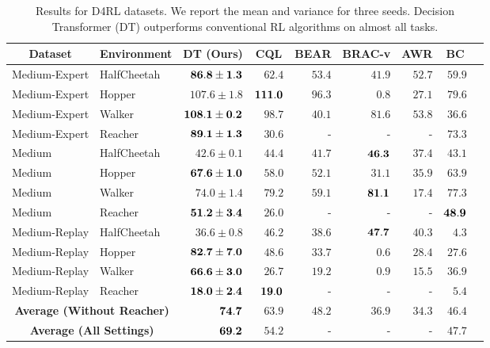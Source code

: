 \addtocounter{footnote}{-1}
\begin{table}[h]
\centering
\small
\begin{tabular}{llrrrrrrr}
\toprule
\multicolumn{1}{c}{\bf Dataset} & \multicolumn{1}{c}{\bf Environment} & \multicolumn{1}{c}{\bf DT (Ours)} & \multicolumn{1}{c}{\bf CQL} & \multicolumn{1}{c}{\bf BEAR} & \multicolumn{1}{c}{\bf BRAC-v} & \multicolumn{1}{c}{\bf AWR} & \multicolumn{1}{c}{\bf BC} \\
\midrule
Medium-Expert & HalfCheetah &  $\bf{86.8} \pm 1.3$ &  $62.4$ &  $53.4$ &  $41.9$ & $52.7$ & $59.9$ \\
Medium-Expert & Hopper      & $107.6 \pm 1.8$ & $\bf{111.0}$ &  $96.3$ &   $0.8$ & $27.1$ & $79.6$ \\
Medium-Expert & Walker      & $\bf{108.1} \pm 0.2$ &  $98.7$ &  $40.1$ &  $81.6$ & $53.8$ & $36.6$ \\
Medium-Expert & Reacher     &  $\bf{89.1 \pm 1.3}$ &  $30.6$ &       - &       - &      - & $73.3$ \\
\midrule
Medium        & HalfCheetah &  $42.6 \pm 0.1$ &  $44.4$ &  $41.7$ &  $\bf{46.3}$ & $37.4$ & $43.1$ \\
Medium        & Hopper      &  $\bf{67.6} \pm 1.0$ &  $58.0$ &  $52.1$ &  $31.1$ & $35.9$ & $63.9$ \\
Medium        & Walker      &   $74.0 \pm 1.4$ &  $79.2$ &  $59.1$ & $\bf{81.1}$ & $17.4$ & $77.3$ \\
Medium        & Reacher     &  $\bf{51.2 \pm 3.4}$ &     $26.0$ &       - &    - &      - & $\bf{48.9}$  \\
\midrule
Medium-Replay & HalfCheetah &  $36.6 \pm 0.8$ &  $46.2$ &  $38.6$ &  $\bf{47.7}$ & $40.3$ & $4.3$ \\
Medium-Replay & Hopper      &  $\bf{82.7 \pm 7.0}$ &  $48.6$ &  $33.7$ &   $0.6$ & $28.4$ & $27.6$ \\
Medium-Replay & Walker      &  $\bf{66.6 \pm 3.0}$ &  $26.7$ &  $19.2$ &   $0.9$ & $15.5$ & $36.9$ \\
Medium-Replay & Reacher     &  $\bf{18.0 \pm 2.4}$ & $\bf{19.0}$ &       - &   - &      - & $5.4$ \\
\midrule
\multicolumn{2}{c}{\bf Average (Without Reacher)} &  $\bf{74.7}$      & $63.9$ & $48.2$ & $36.9$ & $34.3$ & $46.4$ \\
\multicolumn{2}{c}{\bf Average (All Settings)}    &  $\bf{69.2}$      & $54.2$ &    -   &    -   & - & $47.7$ \\
\bottomrule
\end{tabular}
\caption{
Results for D4RL datasets\protect\footnotemark.
We report the mean and variance for three seeds.
Decision Transformer (DT) outperforms conventional RL algorithms on almost all tasks.}
\label{tbl:mujoco_results}
\end{table}
